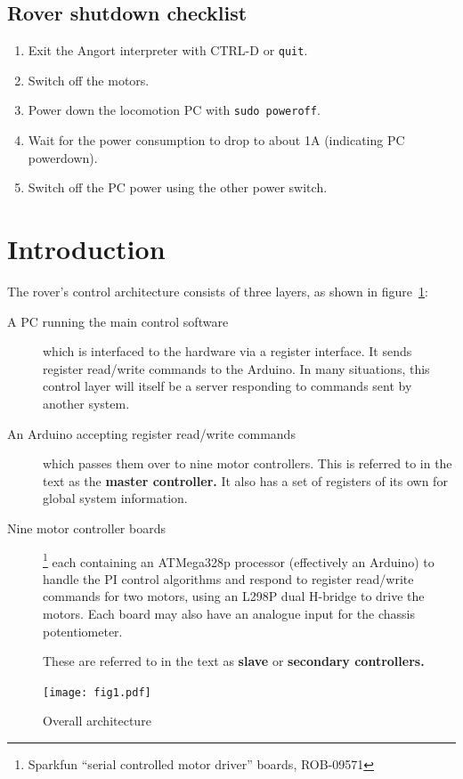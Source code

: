 \subsection{Rover shutdown checklist}
\begin{enumerate}
\item Exit the Angort interpreter with CTRL-D or \texttt{quit}.
\item Switch off the motors.
\item Power down the locomotion PC with \texttt{sudo poweroff}.
\item Wait for the power consumption to drop to about 1A (indicating
PC powerdown).
\item Switch off the PC power using the other power switch.
\end{enumerate}



\section{Introduction}
The rover's control architecture consists of three layers, as shown
in figure~\ref{fig1}:
\begin{description}
\item[A PC running the main control software] which is interfaced to the
hardware via a register interface. It sends register read/write commands
to the Arduino. In many situations, this control layer will itself
be a server responding to commands sent by another system.
\item[An Arduino accepting register read/write commands] which passes
them over
\isqc{} to nine motor controllers. This is referred to in the text as
the \textbf{master controller.} It also has a set of registers of its own
for global system information.
\item[Nine motor controller boards]\footnote{Sparkfun ``serial controlled
motor driver'' boards, ROB-09571} each containing an ATMega328p processor
(effectively an Arduino) to handle the PI control algorithms and respond
to register read/write commands for two motors, using an
L298P dual H-bridge to drive the motors. Each board may also have an analogue
input for the chassis potentiometer.

These are
referred to in the text as \textbf{slave} or \textbf{secondary controllers.} 
\end{description}

\begin{figure}[ht]
\center
\texttt{[image: fig1.pdf]}
\caption{Overall architecture}
\label{fig1}
\end{figure}


